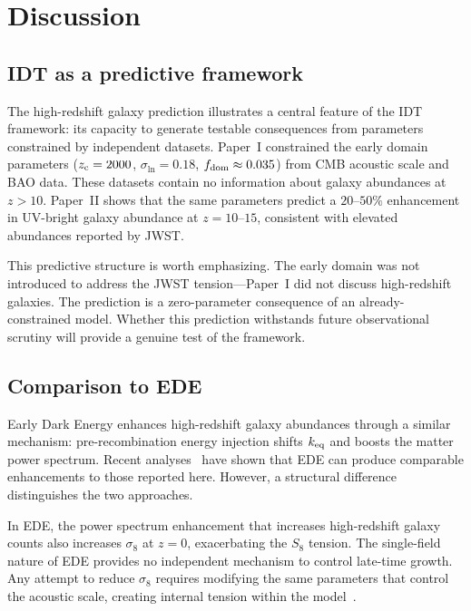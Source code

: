 \documentclass[aps,prd,twocolumn,superscriptaddress,nofootinbib]{revtex4-2}
\newcommand{\fdom}{f_{\rm dom}}
\newcommand{\zc}{z_{\rm c}}
\newcommand{\sln}{\sigma_{\ln}}
\begin{document}
\section{Discussion}
\label{sec:discussion}

\subsection{IDT as a predictive framework}
\label{sec:predictive}

The high-redshift galaxy prediction illustrates a central feature of
the IDT framework: its capacity to generate testable consequences
from parameters constrained by independent datasets. Paper~I
constrained the early domain parameters ($\zc = 2000$, $\sln = 0.18$,
$\fdom \approx 0.035$) from CMB acoustic scale and BAO data. These
datasets contain no information about galaxy abundances at $z > 10$.
Paper~II shows that the same parameters predict a $20$--$50\%$
enhancement in UV-bright galaxy abundance at $z = 10$--$15$,
consistent with elevated abundances reported by JWST.

This predictive structure is worth emphasizing. The early domain
was not introduced to address the JWST tension---Paper~I did not
discuss high-redshift galaxies. The prediction is a zero-parameter
consequence of an already-constrained model. Whether this prediction
withstands future observational scrutiny will provide a genuine test
of the framework.

\subsection{Comparison to EDE}
\label{sec:ede_comparison}

Early Dark Energy enhances high-redshift galaxy abundances through a
similar mechanism: pre-recombination energy injection shifts
$k_{\rm eq}$ and boosts the matter power spectrum. Recent
analyses~\cite{Shen2024} have shown that EDE can produce comparable
enhancements to those reported here. However, a structural difference
distinguishes the two approaches.

In EDE, the power spectrum enhancement that increases high-redshift
galaxy counts also increases $\sigma_8$ at $z = 0$, exacerbating the
$S_8$ tension. The single-field nature of EDE provides no independent
mechanism to control late-time growth. Any attempt to reduce $\sigma_8$
requires modifying the same parameters that control the acoustic
scale, creating internal tension within the
model~\cite{Hill2020,Ivanov2020}.
\end{document}
